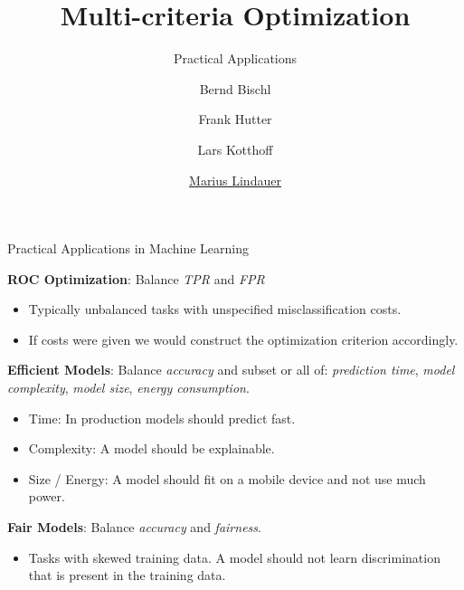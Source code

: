 


\newcommand{\q}[0]{\mathbf{q}}
\newcommand{\Xspace}[0]{\mathcal{X}}

\title[AutoML: Overview]{Multi-criteria Optimization}
\subtitle{Practical Applications}
\author[Bernd Bischl]{Bernd Bischl \and Frank Hutter \and Lars Kotthoff \and \underline{Marius Lindauer}}
\institute{}
\date{}






	\maketitle



\begin{frame}[allowframebreaks]{Practical Applications in Machine Learning}

\textbf{ROC Optimization}:
  Balance \emph{TPR} and \emph{FPR}
  \begin{itemize}
    \item Typically unbalanced tasks with unspecified misclassification costs.
    \item If costs were given we would construct the optimization criterion accordingly.
  \end{itemize}  

\textbf{Efficient Models}:
  Balance \emph{accuracy} and subset or all of: \emph{prediction time}, \emph{model complexity}, \emph{model size}, \emph{energy consumption}.
  \begin{itemize}
    \item Time: In production models should predict fast.
    \item Complexity: A model should be explainable.
    \item Size / Energy: A model should fit on a mobile device and not use much power.
  \end{itemize}

\textbf{Fair Models}:
  Balance \emph{accuracy} and \emph{fairness}.
  \begin{itemize}
    \item Tasks with skewed training data. A model should not learn discrimination that is present in the training data. 
  \end{itemize}

\end{frame}

